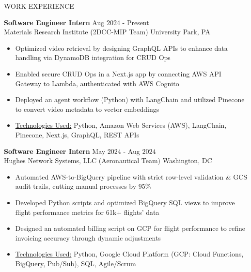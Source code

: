 \documentclass{resume} %
\begin{document}
\begin{rSection}{WORK EXPERIENCE}

{\bf Software Engineer Intern} \hfill Aug $2024$ - Present\\
Materials Research Institute (2DCC-MIP Team) \hfill University Park, PA
\begin{itemize}[itemsep = -4pt]
    \item Optimized video retrieval by designing GraphQL APIs to enhance data handling via DynamoDB integration for CRUD Ops
    \item Enabled secure CRUD Ops in a Next.js app by connecting AWS API Gateway to Lambda, authenticated with AWS Cognito
    \item Deployed an agent workflow (Python) with LangChain and utilized Pinecone to convert video metadata to vector embeddings
    \item \underline{Technologies Used:} Python, Amazon Web Services (AWS), LangChain, Pinecone, Next.js, GraphQL, REST APIs
\end{itemize}

{\bf Software Engineer Intern} \hfill May $2024$ - Aug $2024$\\
Hughes Network Systems, LLC (Aeronautical Team) \hfill Washington, DC
\begin{itemize}[itemsep = -4pt]
    \item Automated AWS-to-BigQuery pipeline with strict row-level validation \& GCS audit trails, cutting manual processes by 95\%
    \item Developed Python scripts and optimized BigQuery SQL views to improve flight performance metrics for 61k+ flights' data
    \item Designed an automated billing script on GCP for flight performance to refine invoicing accuracy through dynamic adjustments
    \item \underline{Technologies Used:} Python, Google Cloud Platform (GCP: Cloud Functions, BigQuery, Pub/Sub), SQL, Agile/Scrum
\end{itemize}


\end{rSection}
\end{document}
